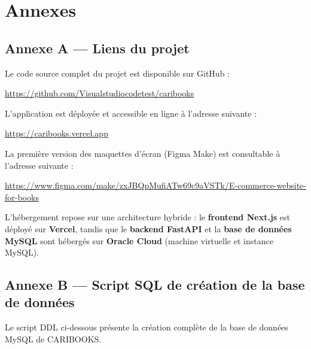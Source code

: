 \documentclass[12pt, a4paper]{report}
\renewcommand{\_}{\origunderscore\allowbreak}
\begin{document}
\chapter*{Annexes}

\section*{Annexe A — Liens du projet}

Le code source complet du projet est disponible sur GitHub :
\begin{center}
    \url{https://github.com/Visualstudiocodetest/caribooks}
\end{center}

\noindent L'application est déployée et accessible en ligne à l'adresse suivante :
\begin{center}
    \url{https://caribooks.vercel.app}
\end{center}

\noindent La première version des maquettes d'écran (Figma Make) est consultable à l'adresse
suivante :
\begin{center}
    \url{https://www.figma.com/make/zxJBQpMufiATw69c9aVSTk/E-commerce-website-for-books}
\end{center}

\noindent L'hébergement repose sur une architecture hybride : le \textbf{frontend Next.js} est déployé sur \textbf{Vercel}, tandis que le \textbf{backend FastAPI} et la \textbf{base de données MySQL} sont hébergés sur \textbf{Oracle Cloud} (machine virtuelle et instance MySQL).

\section*{Annexe B — Script SQL de création de la base de données}

Le script DDL ci-dessous présente la création complète de la base de données MySQL de CARIBOOKS.
\end{document}
